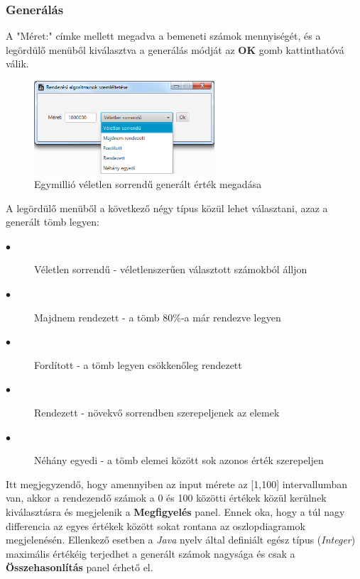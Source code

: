\documentclass{elteikthesis}
\begin{document}
\subsubsection{Generálás}
A "Méret:" címke mellett megadva a bemeneti számok mennyiségét, és a legördülő menüből kiválasztva a generálás módját az \textbf{OK} gomb kattinthatóvá válik.
\begin{figure}[H]
	\centering
	\includegraphics[width=0.6\textwidth]{pics/randominput.png}
	\caption{Egymillió véletlen sorrendű generált érték megadása}
\end{figure}
 A legördülő menüből a következő négy típus közül lehet választani, azaz a generált tömb legyen:
\begin{description}
	\item[$\bullet$] Véletlen sorrendű - véletlenszerűen választott számokból álljon
	\item[$\bullet$] Majdnem rendezett - a tömb 80\%-a már rendezve legyen
	\item[$\bullet$] Fordított - a tömb legyen csökkenőleg rendezett
	\item[$\bullet$] Rendezett - növekvő sorrendben szerepeljenek az elemek
	\item[$\bullet$] Néhány egyedi - a tömb elemei között sok azonos érték szerepeljen
\end{description}
\par Itt megjegyzendő, hogy amennyiben az input mérete az [1,100] intervallumban van, akkor a rendezendő számok a 0 és 100 közötti értékek közül kerülnek kiválasztásra és megjelenik a \textbf{Megfigyelés} panel. Ennek oka, hogy a túl nagy differencia az egyes értékek között sokat rontana az oszlopdiagramok megjelenésén. Ellenkező esetben a \emph{Java} nyelv által definiált egész típus (\emph{Integer}) maximális értékéig terjedhet a generált számok nagysága és csak a \textbf{Összehasonlítás} panel érhető el.
 
\end{document}
